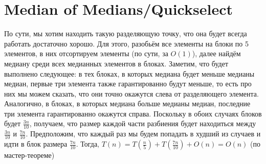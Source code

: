\section{Median of Medians/Quickselect}

По сути, мы хотим находить такую разделяющую точку, что она будет всегда работать достаточно хорошо. Для этого, разобьём все элементы на блоки по 5 элементов, в них отсортируем элементы (по сути, за $O(1)$), далее найдём медиану среди всех медианных элементов в блоках. Заметим, что будет выполнено следующее: в тех блоках, в которых медиана будет меньше медианы медиан, первые три элемента также гарантированно будут меньше, то есть про них мы можем сказать, что они точно окажутся слева от разделяющего элемента. Аналогично, в блоках, в которых медиана больше медианы медиан, последние три элемента гарантированно окажутся справа. Поскольку в обоих случаях блоков будет $\frac{3n}{10}$, получаем, что размер каждой части разбиения будет находиться между $\frac{3n}{10}$ и $\frac{7n}{10}$. Предположим, что каждый раз мы будем попадать в худший из случаев и идти в блок размера $\frac{7n}{10}$. Тогда, $T(n) = T(\frac{n}{5}) + T(\frac{7n}{10}) + O(n) = O(n)$ (по мастер-теореме)